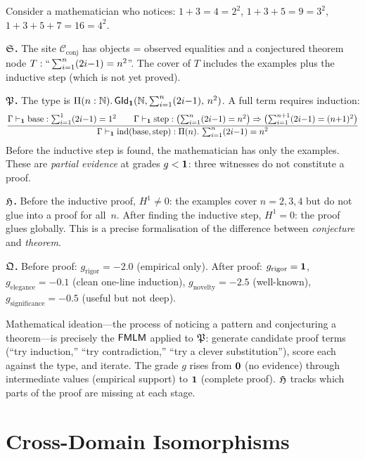 Consider a mathematician who notices:
$1+3=4=2^2$,\;
$1+3+5=9=3^2$,\;
$1+3+5+7=16=4^2$.

\textbf{$\mathfrak{S}$.}\quad
The site $\mathcal{C}_{\mathrm{conj}}$ has objects = observed
equalities and a conjectured theorem node
$T:``\sum_{i=1}^n(2i{-}1)=n^2$''.  The cover of $T$ includes
the examples plus the inductive step (which is not yet proved).

\textbf{$\mathfrak{P}$.}\quad
The type is $\Pi(n:\mathbb{N}).\,\mathsf{GId}_{\mathbf{1}}(\mathbb{N},
  \sum_{i=1}^n(2i{-}1),\,n^2)$.
A full term requires induction:
\[
  \dfrac{
    \Gamma\vdash_{\mathbf{1}}\mathrm{base}:\sum_{i=1}^1(2i{-}1)=1^2
    \qquad
    \Gamma\vdash_{\mathbf{1}}\mathrm{step}:
      \bigl(\textstyle\sum_{i=1}^n(2i{-}1)=n^2\bigr)
      \Rightarrow
      \bigl(\textstyle\sum_{i=1}^{n+1}(2i{-}1)=(n{+}1)^2\bigr)
  }{
    \Gamma\vdash_{\mathbf{1}}\mathrm{ind}(\mathrm{base},\mathrm{step}):
      \Pi(n).\,\textstyle\sum_{i=1}^n(2i{-}1)=n^2
  }
\]
Before the inductive step is found, the mathematician has only
the examples.  These are \emph{partial evidence} at grades
$g<\mathbf{1}$: three witnesses do not constitute a proof.

\textbf{$\mathfrak{H}$.}\quad
Before the inductive proof, $H^1\neq 0$: the examples cover
$n=2,3,4$ but do not glue into a proof for all~$n$.  After
finding the inductive step, $H^1=0$: the proof glues globally.
This is a precise formalisation of the difference between
\emph{conjecture} and \emph{theorem}.

\textbf{$\mathfrak{Q}$.}\quad
Before proof: $g_{\mathrm{rigor}}=-2.0$ (empirical only).
After proof: $g_{\mathrm{rigor}}=\mathbf{1}$,
$g_{\mathrm{elegance}}=-0.1$ (clean one-line induction),
$g_{\mathrm{novelty}}=-2.5$ (well-known),
$g_{\mathrm{significance}}=-0.5$ (useful but not deep).

\begin{remark}
Mathematical ideation---the process of noticing a pattern and
conjecturing a theorem---is precisely the $\mathsf{FMLM}$ applied to
$\mathfrak{P}$: generate candidate proof terms (``try induction,''
``try contradiction,'' ``try a clever substitution''), score
each against the type, and iterate.  The grade $g$ rises from
$\mathbf{0}$ (no evidence) through intermediate values (empirical
support) to $\mathbf{1}$ (complete proof).  $\mathfrak{H}$ tracks which
parts of the proof are missing at each stage.
\end{remark}

\chapter{Cross-Domain Isomorphisms}
\label{ch:isomorphisms}

